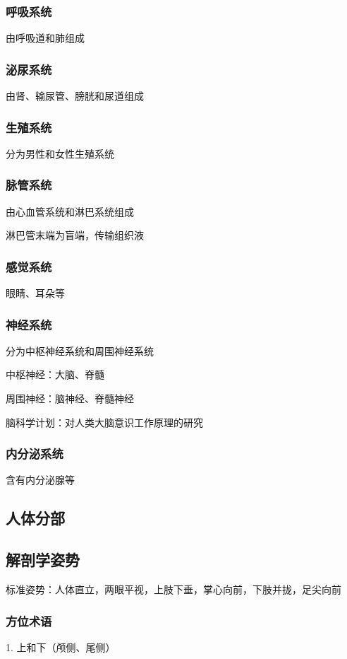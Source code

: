 \subsubsection*{呼吸系统}%
\label{subsub:呼吸系统}
由呼吸道和肺组成
\subsubsection*{泌尿系统}%
\label{subsub:泌尿系统}
由肾、输尿管、膀胱和尿道组成
\subsubsection*{生殖系统}%
\label{subsub:生殖系统}
分为男性和女性生殖系统
\subsubsection*{脉管系统}%
\label{subsub:脉管系统}
由心血管系统和淋巴系统组成
\begin{notation}
    淋巴管末端为盲端，传输组织液
\end{notation}
\subsubsection*{感觉系统}%
\label{subsub:感觉系统}
眼睛、耳朵等
\subsubsection*{神经系统}%
\label{subsub:神经系统}
分为中枢神经系统和周围神经系统

中枢神经：大脑、脊髓

周围神经：脑神经、脊髓神经
\begin{notation}
    脑科学计划：对人类大脑意识工作原理的研究
\end{notation}
\subsubsection*{内分泌系统}%
\label{subsub:内分泌系统}
含有内分泌腺等
\subsection{人体分部}%
\label{sub:人体分部}
\subsection{解剖学姿势}%
\label{sub:解剖学姿势}
标准姿势：人体直立，两眼平视，上肢下垂，掌心向前，下肢并拢，足尖向前
\subsubsection{方位术语}%
\label{subsub:方位术语}
1. 上和下（颅侧、尾侧）


